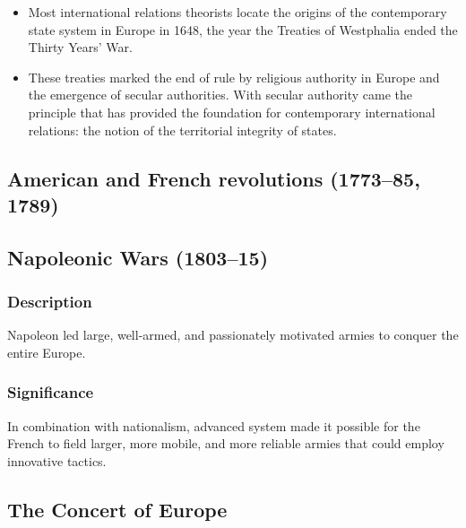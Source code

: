 \documentclass[
]{book}
\begin{document}
\begin{itemize}
\item
  Most international relations theorists locate the origins of the contemporary state system in Europe in 1648, the year the Treaties of Westphalia ended the Thirty Years' War.
\item
  These treaties marked the end of rule by religious authority in Europe
  and the emergence of secular authorities. With secular authority came the principle that has provided the foundation for contemporary international relations: the notion of the territorial integrity of states.
\end{itemize}

\hypertarget{american-and-french-revolutions-177385-1789}{%
\subsection{American and French revolutions (1773--85, 1789)}\label{american-and-french-revolutions-177385-1789}}

\hypertarget{napoleonic-wars-180315}{%
\subsection{Napoleonic Wars (1803--15)}\label{napoleonic-wars-180315}}

\hypertarget{description-2}{%
\subsubsection{Description}\label{description-2}}

Napoleon led large, well-armed, and passionately motivated armies to conquer the entire Europe.

\hypertarget{significance-2}{%
\subsubsection{Significance}\label{significance-2}}

In combination with nationalism, advanced system made it possible for the French to field larger, more mobile, and more reliable armies that could employ innovative tactics.

\hypertarget{the-concert-of-europe}{%
\subsection{The Concert of Europe}\label{the-concert-of-europe}}
\end{document}
